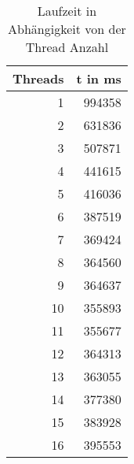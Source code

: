 \begin{table}[htbp]
  \centering
  \caption{Laufzeit in Abh\"angigkeit von der Thread Anzahl}
    \begin{tabular}{rr}
    \toprule
    \multicolumn{1}{c}{Threads} & \multicolumn{1}{c}{t in ms} \\
    \midrule
    1     & 994358 \\
    \midrule
    2     & 631836 \\
    \midrule
    3     & 507871 \\
    \midrule
    4     & 441615 \\
    \midrule
    5     & 416036 \\
    \midrule
    6     & 387519 \\
    \midrule
    7     & 369424 \\
    \midrule
    8     & 364560 \\
    \midrule
    9     & 364637 \\
    \midrule
    10    & 355893 \\
    \midrule
    11    & 355677 \\
    \midrule
    12    & 364313 \\
    \midrule
    13    & 363055 \\
    \midrule
    14    & 377380 \\
    \midrule
    15    & 383928 \\
    \midrule
    16    & 395553 \\
    \bottomrule
    \end{tabular}%
  \label{tab:Base64Laufzeit}%
\end{table}%
